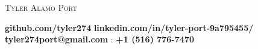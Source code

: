 \documentclass[9pt]{article}
\begin{document}
\begin{center}
	{\Large \scshape Tyler Alamo Port}
\end{center}
\vspace*{-2pt}
\hspace{7.25mm} \faGithub \hspace{0.25mm} \textbf{github.com/tyler274} \hspace{7.25mm} \faLinkedinSquare \hspace{0.25mm} \textbf{linkedin.com/in/tyler-port-9a795455/} \\
\vspace*{3pt}  \hspace{12.25mm} \faEnvelope \hspace{0.1mm} \textbf{tyler274port@gmail.com} \hspace{8.25mm} \faMobile : \textbf{+1 (516) 776-7470}\\
\vspace{1pt}
\smallskip
\end{document}

